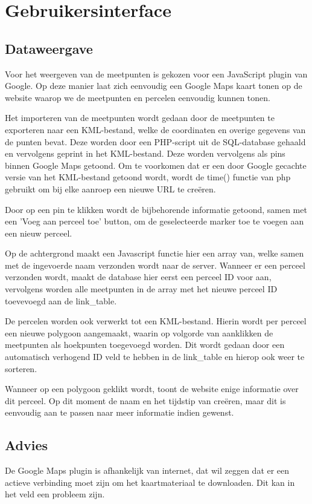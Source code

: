 \section{Gebruikersinterface}
\subsection{Dataweergave}
Voor het weergeven van de meetpunten is gekozen voor een JavaScript plugin van Google.
Op deze manier laat zich eenvoudig een Google Maps kaart tonen op de website waarop we de
meetpunten en percelen eenvoudig kunnen tonen.

Het importeren van de meetpunten wordt gedaan door de meetpunten te exporteren naar een
KML-bestand, welke de coordinaten en overige gegevens van de punten bevat. Deze worden
door een PHP-script uit de SQL-database gehaald en vervolgens geprint in het KML-bestand.
Deze worden vervolgens als pins binnen Google Maps getoond. Om te voorkomen dat er een
door Google gecachte versie van het KML-bestand getoond wordt, wordt de time() functie van
php gebruikt om bij elke aanroep een nieuwe URL te creëren.

Door op een pin te klikken wordt de bijbehorende informatie getoond, samen met een 'Voeg
aan perceel toe' button, om de geselecteerde marker toe te voegen aan een nieuw perceel.

Op de achtergrond maakt een Javascript functie hier een array van, welke samen met de
ingevoerde naam verzonden wordt naar de server.
Wanneer er een perceel verzonden wordt, maakt de database hier eerst een perceel ID voor
aan, vervolgens worden alle meetpunten in de array met het nieuwe perceel ID toevevoegd
aan de link\_table.

De percelen worden ook verwerkt tot een KML-bestand. Hierin wordt per perceel een nieuwe
polygoon aangemaakt, waarin op volgorde van aanklikken de meetpunten als hoekpunten
toegevoegd worden. Dit wordt gedaan door een automatisch verhogend ID veld te hebben in de
link\_table en hierop ook weer te sorteren.

Wanneer op een polygoon geklikt wordt, toont de website enige informatie over dit perceel.
Op dit moment de naam en het tijdstip van creëren, maar dit is eenvoudig aan te passen naar
meer informatie indien gewenst.


\subsection{Advies}
De Google Maps plugin is afhankelijk van internet, dat wil zeggen dat er een actieve
verbinding moet zijn om het kaartmateriaal te downloaden. Dit kan in het veld een
probleem zijn.
